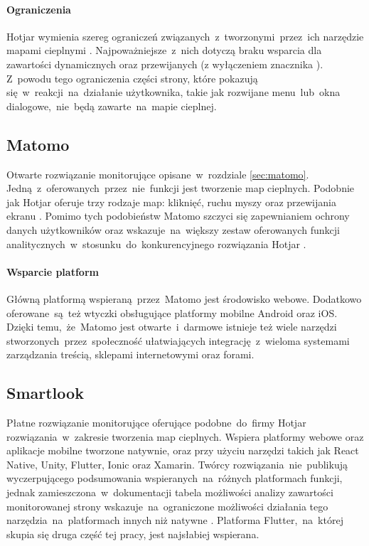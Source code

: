 \paragraph{Ograniczenia} 
Hotjar wymienia szereg ograniczeń związanych~z~tworzonymi~przez~ich narzędzie mapami cieplnymi \cite{Hotjar_limitations}. Najpoważniejsze~z~nich dotyczą braku wsparcia dla zawartości dynamicznych oraz przewijanych (z wyłączeniem znacznika ). Z~powodu tego ograniczenia części strony, które pokazują się~w~reakcji~na~działanie użytkownika, takie jak rozwijane menu~lub~okna dialogowe,~nie~będą zawarte~na~mapie cieplnej.

\subsection{Matomo}
\label{sec:matomo_heatmap}
Otwarte rozwiązanie monitorujące opisane~w~rozdziale \ref{sec:matomo}. Jedną~z~oferowanych~przez~nie~funkcji jest tworzenie map cieplnych. Podobnie jak Hotjar oferuje trzy rodzaje map: kliknięć, ruchu myszy oraz przewijania ekranu \cite{Matomo_heatmaps}. Pomimo tych podobieństw Matomo szczyci się zapewnianiem ochrony danych użytkowników oraz wskazuje~na~większy zestaw oferowanych funkcji analitycznych~w~stosunku~do~konkurencyjnego rozwiązania Hotjar \cite{Matomo_hotjar}.

\paragraph{Wsparcie platform} 
Główną platformą wspieraną~przez~Matomo jest środowisko webowe. Dodatkowo oferowane~są~też wtyczki obsługujące platformy mobilne Android oraz iOS. Dzięki temu,~że~Matomo jest otwarte~i~darmowe istnieje też wiele narzędzi stworzonych~przez~społeczność ułatwiających integrację~z~wieloma systemami zarządzania treścią, sklepami internetowymi oraz forami.

\subsection{Smartlook}
\label{sec:smartlook}
Płatne rozwiązanie monitorujące oferujące podobne~do~firmy Hotjar rozwiązania~w~zakresie tworzenia map cieplnych. Wspiera platformy webowe oraz aplikacje mobilne tworzone natywnie, oraz przy użyciu narzędzi takich jak React Native, Unity, Flutter, Ionic oraz Xamarin. Twórcy rozwiązania~nie~publikują wyczerpującego podsumowania wspieranych~na~różnych platformach funkcji, jednak zamieszczona~w~dokumentacji tabela możliwości analizy zawartości monitorowanej strony wskazuje~na~ograniczone możliwości działania tego narzędzia~na~platformach innych niż natywne \cite{Smartlook_support}. Platforma Flutter,~na~której skupia się druga część tej pracy, jest najsłabiej wspierana.

